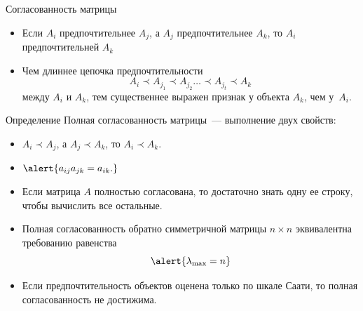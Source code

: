 \documentclass[unicode,11pt,notheorems,xcolor=table]{beamer}
\begin{document}
\begin{frame}[allowframebreaks]{Согласованность матрицы}{}
    \begin{itemize}
        \item Если $A_i$ предпочтительнее $A_j$, а $A_j$ предпочтительнее $A_k$, то $A_i$ предпочтительней $A_k$
        \item Чем длиннее цепочка предпочтительности
        $$
            A_i \prec A_{j_1} \prec A_{j_2}\ldots \prec A_{j_t} \prec A_{k}
        $$
        между $A_i$ и $A_k$, тем существеннее выражен признак у объекта $A_k$, чем у~$A_i$.
    \end{itemize}

    \begin{block}{Определение}
        \alert{Полная согласованность} матрицы~--- выполнение двух свойств:
        \begin{itemize}
            \item $A_i\prec A_j$, а $A_j \prec A_k$, то $A_i \prec A_k$.
            \item $\alert{a_{ij}a_{jk}=a_{ik}.}$
        \end{itemize}
    \end{block}
    \framebreak
        \begin{itemize}
            \item Если матрица $A$ полностью согласована, то достаточно знать одну ее строку, чтобы вычислить все остальные. 
            \item Полная согласованность обратно симметричной матрицы $n\times n$ эквивалентна требованию равенства 
            $$
               \alert{\lambda_{\max} =n }
            $$
            \item Если предпочтительность объектов оценена только по шкале Саати, то полная согласованность  не достижима.
        \end{itemize}
    \end{frame}
\end{document}
